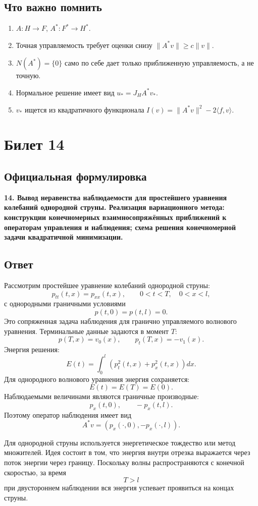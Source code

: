 \documentclass[12pt,a4paper]{article}
\begin{document}
\subsection*{Что важно помнить}
\begin{enumerate}
\item $A:H\to F$, $A^*:F^*\to H^*$.
\item Точная управляемость требует оценки снизу $\|A^*v\|\ge c\|v\|$.
\item $N(A^*)=\{0\}$ само по себе дает только приближенную управляемость, а не точную.
\item Нормальное решение имеет вид $u_*=J_HA^*v_*$.
\item $v_*$ ищется из квадратичного функционала $I(v)=\|A^*v\|^2-2\langle f,v\rangle$.
\end{enumerate}

\newpage
\section*{Билет 14}

\subsection*{Официальная формулировка}
\textbf{14. Вывод неравенства наблюдаемости для простейшего уравнения колебаний однородной струны. Реализация вариационного метода: конструкции конечномерных взаимносопряжённых приближений к операторам управления и наблюдения; схема решения конечномерной задачи квадратичной минимизации.}

\subsection*{Ответ}
Рассмотрим простейшее уравнение колебаний однородной струны:
\[
 p_{tt}(t,x)=p_{xx}(t,x),
 \qquad 0<t<T,\quad 0<x<l,
\]
с однородными граничными условиями
\[
 p(t,0)=p(t,l)=0.
\]
Это сопряженная задача наблюдения для гранично управляемого волнового уравнения. Терминальные данные задаются в момент $T$:
\[
 p(T,x)=v_0(x),
 \qquad
 p_t(T,x)=-v_1(x).
\]
Энергия решения:
\[
 E(t)=\int_0^l\left(p_t^2(t,x)+p_x^2(t,x)\right)dx.
\]
Для однородного волнового уравнения энергия сохраняется:
\[
 E(t)=E(T)=E(0).
\]
Наблюдаемыми величинами являются граничные производные:
\[
 p_x(t,0),\qquad -p_x(t,l).
\]
Поэтому оператор наблюдения имеет вид
\[
 A^*v=(p_x(\cdot,0),-p_x(\cdot,l)).
\]

Для однородной струны используется энергетическое тождество или метод множителей. Идея состоит в том, что энергия внутри отрезка выражается через поток энергии через границу. Поскольку волны распространяются с конечной скоростью, за время
\[
 T>l
\]
при двустороннем наблюдении вся энергия успевает проявиться на концах струны.
\end{document}

